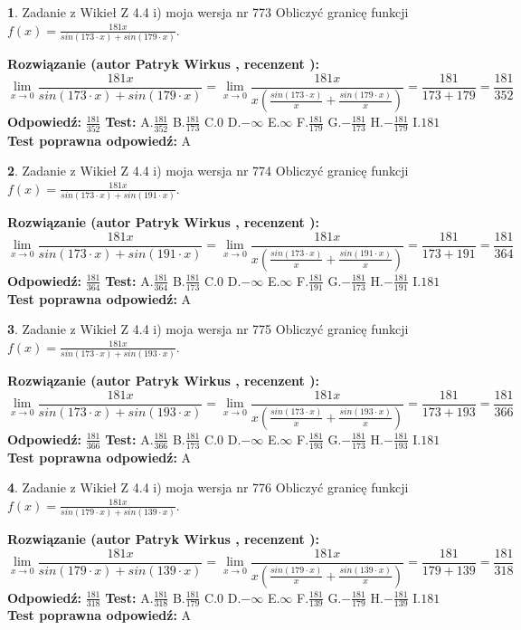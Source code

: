 \documentclass[12pt, a4paper]{article}
\theoremstyle{definition} %
\newtheorem{zad}{}
\newcommand{\zadStart}[1]{\begin{zad}#1\newline}
\newcommand{\zadStop}{\end{zad}}
\newcommand{\rozwStart}[2]{\noindent \textbf{Rozwiązanie (autor #1 , recenzent #2): }\newline}
\newcommand{\rozwStop}{\newline}
\newcommand{\odpStart}{\noindent \textbf{Odpowiedź:}\newline}
\newcommand{\odpStop}{\newline}
\newcommand{\testStart}{\noindent \textbf{Test:}\newline}
\newcommand{\testStop}{\newline}
\newcommand{\kluczStart}{\noindent \textbf{Test poprawna odpowiedź:}\newline}
\newcommand{\kluczStop}{\newline}
\begin{document}
\zadStart{Zadanie z Wikieł Z 4.4 i) moja wersja nr 773}
Obliczyć granicę funkcji $f(x)=\frac{181x}{sin(173\cdot x) +sin(179\cdot x)}$.
\zadStop
\rozwStart{Patryk Wirkus}{}
$$\lim\limits_{x\to 0}\frac{181x}{sin(173\cdot x) +sin(179\cdot x)}=\lim\limits_{x\to 0}\frac{181x}{x(\frac{sin(173\cdot x)}{x}+\frac{sin(179\cdot x)}{x})}=\frac{181}{173+179} = \frac{181}{352}$$
\rozwStop
\odpStart
$\frac{181}{352}$
\odpStop
\testStart
A.$\frac{181}{352}$
B.$\frac{181}{173}$
C.$0$
D.$-\infty$
E.$\infty$
F.$\frac{181}{179}$
G.$-\frac{181}{173}$
H.$-\frac{181}{179}$
I.$181$
\testStop
\kluczStart
A
\kluczStop



\zadStart{Zadanie z Wikieł Z 4.4 i) moja wersja nr 774}
Obliczyć granicę funkcji $f(x)=\frac{181x}{sin(173\cdot x) +sin(191\cdot x)}$.
\zadStop
\rozwStart{Patryk Wirkus}{}
$$\lim\limits_{x\to 0}\frac{181x}{sin(173\cdot x) +sin(191\cdot x)}=\lim\limits_{x\to 0}\frac{181x}{x(\frac{sin(173\cdot x)}{x}+\frac{sin(191\cdot x)}{x})}=\frac{181}{173+191} = \frac{181}{364}$$
\rozwStop
\odpStart
$\frac{181}{364}$
\odpStop
\testStart
A.$\frac{181}{364}$
B.$\frac{181}{173}$
C.$0$
D.$-\infty$
E.$\infty$
F.$\frac{181}{191}$
G.$-\frac{181}{173}$
H.$-\frac{181}{191}$
I.$181$
\testStop
\kluczStart
A
\kluczStop



\zadStart{Zadanie z Wikieł Z 4.4 i) moja wersja nr 775}
Obliczyć granicę funkcji $f(x)=\frac{181x}{sin(173\cdot x) +sin(193\cdot x)}$.
\zadStop
\rozwStart{Patryk Wirkus}{}
$$\lim\limits_{x\to 0}\frac{181x}{sin(173\cdot x) +sin(193\cdot x)}=\lim\limits_{x\to 0}\frac{181x}{x(\frac{sin(173\cdot x)}{x}+\frac{sin(193\cdot x)}{x})}=\frac{181}{173+193} = \frac{181}{366}$$
\rozwStop
\odpStart
$\frac{181}{366}$
\odpStop
\testStart
A.$\frac{181}{366}$
B.$\frac{181}{173}$
C.$0$
D.$-\infty$
E.$\infty$
F.$\frac{181}{193}$
G.$-\frac{181}{173}$
H.$-\frac{181}{193}$
I.$181$
\testStop
\kluczStart
A
\kluczStop



\zadStart{Zadanie z Wikieł Z 4.4 i) moja wersja nr 776}
Obliczyć granicę funkcji $f(x)=\frac{181x}{sin(179\cdot x) +sin(139\cdot x)}$.
\zadStop
\rozwStart{Patryk Wirkus}{}
$$\lim\limits_{x\to 0}\frac{181x}{sin(179\cdot x) +sin(139\cdot x)}=\lim\limits_{x\to 0}\frac{181x}{x(\frac{sin(179\cdot x)}{x}+\frac{sin(139\cdot x)}{x})}=\frac{181}{179+139} = \frac{181}{318}$$
\rozwStop
\odpStart
$\frac{181}{318}$
\odpStop
\testStart
A.$\frac{181}{318}$
B.$\frac{181}{179}$
C.$0$
D.$-\infty$
E.$\infty$
F.$\frac{181}{139}$
G.$-\frac{181}{179}$
H.$-\frac{181}{139}$
I.$181$
\testStop
\kluczStart
A
\kluczStop
\end{document}
